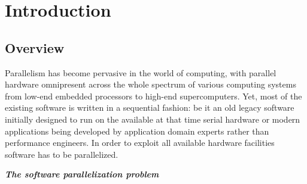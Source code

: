 \chapter{Introduction}
\label{introduction}

\section{Overview}
\label{introduction_overview}
\quad Parallelism has become pervasive in the world of computing, with parallel hardware omnipresent across the whole spectrum of various computing systems from low-end embedded processors to high-end supercomputers. Yet, most of the existing software is written in a sequential fashion: be it an old legacy software initially designed to run on the available at that time serial hardware or modern applications being developed by application domain experts rather than performance engineers. In order to exploit all available hardware facilities software has to be parallelized.
\begin{center}
\textbf{\large \textit{The software parallelization problem}}
\end{center}
